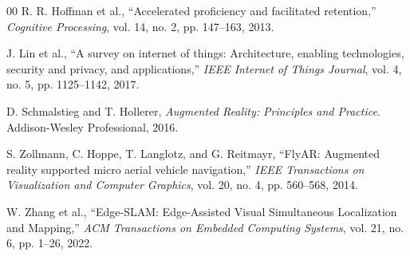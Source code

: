 \documentclass[conference]{IEEEtran}
\begin{document}
\begin{thebibliography}{00}
 R. R. Hoffman et al., ``Accelerated proficiency and facilitated retention,'' \textit{Cognitive Processing}, vol. 14, no. 2, pp. 147--163, 2013.

 J. Lin et al., ``A survey on internet of things: Architecture, enabling technologies, security and privacy, and applications,'' \textit{IEEE Internet of Things Journal}, vol. 4, no. 5, pp. 1125--1142, 2017.

 D. Schmalstieg and T. Hollerer, \textit{Augmented Reality: Principles and Practice}. Addison-Wesley Professional, 2016.

 S. Zollmann, C. Hoppe, T. Langlotz, and G. Reitmayr, ``FlyAR: Augmented reality supported micro aerial vehicle navigation,'' \textit{IEEE Transactions on Visualization and Computer Graphics}, vol. 20, no. 4, pp. 560--568, 2014.

 W. Zhang et al., ``Edge-SLAM: Edge-Assisted Visual Simultaneous Localization and Mapping,'' \textit{ACM Transactions on Embedded Computing Systems}, vol. 21, no. 6, pp. 1--26, 2022.

\end{thebibliography}
\end{document}

